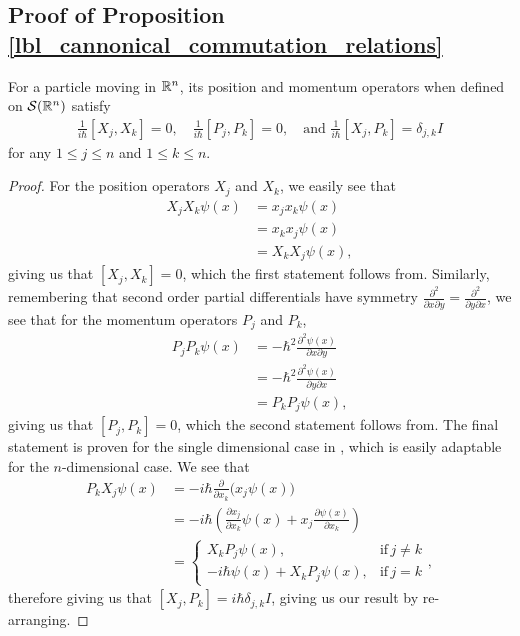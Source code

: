 \subsection{Proof of Proposition \eqref{lbl_cannonical_commutation_relations}}\label{proof_lbl_cannonical_commutation_relations}

\begin{proposition}
  For a particle moving in $\mathbb{R}^n$, its position and momentum operators when defined on $\mathcal{S}(\mathbb{R}^n)$ satisfy
  \begin{align*}
    \frac{1}{i\hbar}[X_j, X_k] = 0, \quad
    \frac{1}{i\hbar}[P_j, P_k] = 0, \quad \text{and}\,\,
    \frac{1}{i\hbar}[X_j, P_k] = \delta_{j,k} I
  \end{align*}
  for any $1 \leq j \leq n$ and $1 \leq k \leq n$.
\end{proposition}
\begin{proof}
  For the position operators $X_j$ and $X_k$, we easily see that
  \begin{align*}
    X_j X_k \psi({x})
    &=
    x_j x_k \psi({x}) \\
    &=
    x_k x_j \psi({x}) \\
    &= X_k X_j \psi({x}),
  \end{align*}
  giving us that $[X_j, X_k] = 0$, which the first statement follows from. Similarly, remembering that second order partial differentials have symmetry $\frac{\partial^2}{\partial x \partial y } = \frac{\partial^2}{\partial y \partial x}$, we see that for the momentum operators $P_j$ and $P_k$,
  \begin{align*}
    P_j P_k \psi({x})
    &=
    -\hbar^2 \frac{\partial^2 \psi({x})}{\partial x \partial y } \\
    &=
    -\hbar^2 \frac{\partial^2 \psi({x})}{\partial y \partial x } \\
    &=
    P_k P_j \psi({x}),
  \end{align*}
  giving us that $[P_j, P_k] = 0$, which the second statement follows from. The final statement is proven for the single dimensional case in {\cite[Proposition 3.8]{Hall2013}}, which is easily adaptable for the $n$-dimensional case. We see that
  \begin{align*}
    P_k X_j \psi({x})
    &=
    -i \hbar \frac{\partial}{\partial x_k} \big( x_j \psi({x}) \big) \\
    &=
    -i \hbar \left( \frac{\partial x_j}{\partial x_k}\psi({x}) + x_j \frac{\partial \psi({x})}{\partial x_k} \right) \\
    &=
    \begin{cases}
      X_k P_j \psi({x}), & \text{if} \, j \neq k \\
      -i \hbar \psi({x}) + X_k P_j \psi({x}), & \text{if} \, j = k
    \end{cases},
  \end{align*}
  therefore giving us that $[X_j, P_k] = i\hbar \delta_{j,k} I$, giving us our result by re-arranging.
\end{proof}

